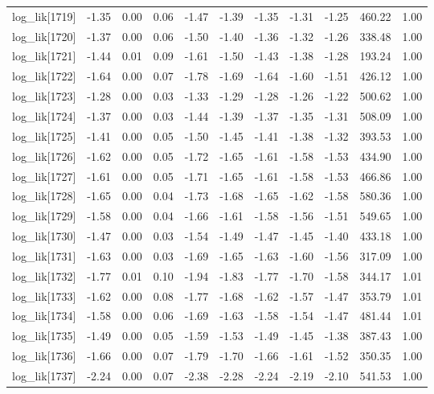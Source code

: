 \begin{table}[ht]
\begin{tabular}{rrrrrrrrrrr}
  log\_lik[1719] & -1.35 & 0.00 & 0.06 & -1.47 & -1.39 & -1.35 & -1.31 & -1.25 & 460.22 & 1.00 \\ 
  log\_lik[1720] & -1.37 & 0.00 & 0.06 & -1.50 & -1.40 & -1.36 & -1.32 & -1.26 & 338.48 & 1.00 \\ 
  log\_lik[1721] & -1.44 & 0.01 & 0.09 & -1.61 & -1.50 & -1.43 & -1.38 & -1.28 & 193.24 & 1.00 \\ 
  log\_lik[1722] & -1.64 & 0.00 & 0.07 & -1.78 & -1.69 & -1.64 & -1.60 & -1.51 & 426.12 & 1.00 \\ 
  log\_lik[1723] & -1.28 & 0.00 & 0.03 & -1.33 & -1.29 & -1.28 & -1.26 & -1.22 & 500.62 & 1.00 \\ 
  log\_lik[1724] & -1.37 & 0.00 & 0.03 & -1.44 & -1.39 & -1.37 & -1.35 & -1.31 & 508.09 & 1.00 \\ 
  log\_lik[1725] & -1.41 & 0.00 & 0.05 & -1.50 & -1.45 & -1.41 & -1.38 & -1.32 & 393.53 & 1.00 \\ 
  log\_lik[1726] & -1.62 & 0.00 & 0.05 & -1.72 & -1.65 & -1.61 & -1.58 & -1.53 & 434.90 & 1.00 \\ 
  log\_lik[1727] & -1.61 & 0.00 & 0.05 & -1.71 & -1.65 & -1.61 & -1.58 & -1.53 & 466.86 & 1.00 \\ 
  log\_lik[1728] & -1.65 & 0.00 & 0.04 & -1.73 & -1.68 & -1.65 & -1.62 & -1.58 & 580.36 & 1.00 \\ 
  log\_lik[1729] & -1.58 & 0.00 & 0.04 & -1.66 & -1.61 & -1.58 & -1.56 & -1.51 & 549.65 & 1.00 \\ 
  log\_lik[1730] & -1.47 & 0.00 & 0.03 & -1.54 & -1.49 & -1.47 & -1.45 & -1.40 & 433.18 & 1.00 \\ 
  log\_lik[1731] & -1.63 & 0.00 & 0.03 & -1.69 & -1.65 & -1.63 & -1.60 & -1.56 & 317.09 & 1.00 \\ 
  log\_lik[1732] & -1.77 & 0.01 & 0.10 & -1.94 & -1.83 & -1.77 & -1.70 & -1.58 & 344.17 & 1.01 \\ 
  log\_lik[1733] & -1.62 & 0.00 & 0.08 & -1.77 & -1.68 & -1.62 & -1.57 & -1.47 & 353.79 & 1.01 \\ 
  log\_lik[1734] & -1.58 & 0.00 & 0.06 & -1.69 & -1.63 & -1.58 & -1.54 & -1.47 & 481.44 & 1.01 \\ 
  log\_lik[1735] & -1.49 & 0.00 & 0.05 & -1.59 & -1.53 & -1.49 & -1.45 & -1.38 & 387.43 & 1.00 \\ 
  log\_lik[1736] & -1.66 & 0.00 & 0.07 & -1.79 & -1.70 & -1.66 & -1.61 & -1.52 & 350.35 & 1.00 \\ 
  log\_lik[1737] & -2.24 & 0.00 & 0.07 & -2.38 & -2.28 & -2.24 & -2.19 & -2.10 & 541.53 & 1.00 \\ 

\end{tabular}
\end{table}
